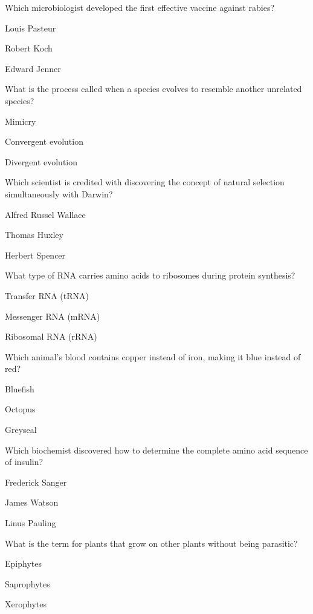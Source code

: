 \begin{enhancedmcq}{Which microbiologist developed the first effective vaccine against rabies?}
\item Louis Pasteur
\item Robert Koch
\item Edward Jenner

\end{enhancedmcq}
\begin{enhancedmcq}{What is the process called when a species evolves to resemble another unrelated species?}
\item Mimicry
\item Convergent evolution
\item Divergent evolution

\end{enhancedmcq}
\begin{enhancedmcq}{Which scientist is credited with discovering the concept of natural selection simultaneously with Darwin?}
\item Alfred Russel Wallace
\item Thomas Huxley
\item Herbert Spencer

\end{enhancedmcq}
\begin{enhancedmcq}{What type of RNA carries amino acids to ribosomes during protein synthesis?}
\item Transfer RNA (tRNA)
\item Messenger RNA (mRNA)
\item Ribosomal RNA (rRNA)

\end{enhancedmcq}
\begin{enhancedmcq}{Which animal's blood contains copper instead of iron, making it blue instead of red?}
\item Bluefish
\item Octopus
\item Greyseal

\end{enhancedmcq}
\begin{enhancedmcq}{Which biochemist discovered how to determine the complete amino acid sequence of insulin?}
\item Frederick Sanger
\item James Watson
\item Linus Pauling

\end{enhancedmcq}
\begin{enhancedmcq}{What is the term for plants that grow on other plants without being parasitic?}
\item Epiphytes
\item Saprophytes
\item Xerophytes

\end{enhancedmcq}
